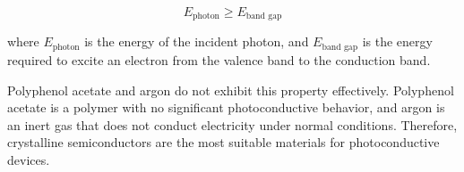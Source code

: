 \[
E_{\text{photon}} \geq E_{\text{band gap}}
\]

where \(E_{\text{photon}}\) is the energy of the incident photon, and \(E_{\text{band gap}}\) is the energy required to excite an electron from the valence band to the conduction band.

Polyphenol acetate and argon do not exhibit this property effectively. Polyphenol acetate is a polymer with no significant photoconductive behavior, and argon is an inert gas that does not conduct electricity under normal conditions. Therefore, crystalline semiconductors are the most suitable materials for photoconductive devices.

